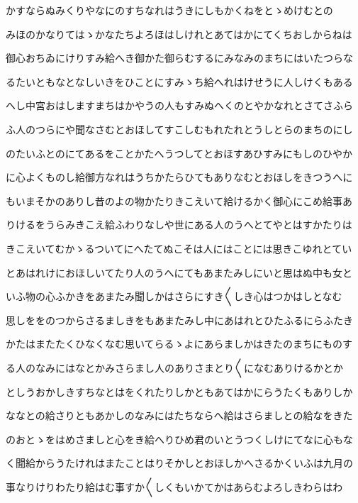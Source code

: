 \documentclass[a4paper,11pt,landscape]{ltjtarticle}
\begin{document}
\par\medskip
かすならぬみくりやなにのすちなれはうきにしもかくねをとゝめけむとの
\par\medskip
みほのかなりてはゝかなたちよろほはしけれとあてはかにてくちおしからねは
\par\medskip
御心おちゐにけりすみ給へき御かた御らむするにみなみのまちにはいたつらな
\par\medskip
るたいともなとなしいきをひことにすみゝち給へれはけせうに人しけくもある
\par\medskip
へし中宮おはしますまちはかやうの人もすみぬへくのとやかなれとさてさふら
\par\medskip
ふ人のつらにや聞なさむとおほしてすこしむもれたれとうしとらのまちのにし
\par\medskip
のたいふとのにてあるをことかたへうつしてとおほすあひすみにもしのひやか
\par\medskip
に心よくものし給御方なれはうちかたらひてもありなむとおほしをきつうへに
\par\medskip
もいまそかのありし昔のよの物かたりきこえいて給けるかく御心にこめ給事あ
\par\medskip
りけるをうらみきこえ給ふわりなしや世にある人のうへとてやとはすかたりは
\par\medskip
きこえいてむかゝるついてにへたてぬこそは人にはことには思きこゆれとてい
\par\medskip
とあはれけにおほしいてたり人のうへにてもあまたみしにいと思はぬ中も女と
\par\medskip
いふ物の心ふかきをあまたみ聞しかはさらにすき〱しき心はつかはしとなむ
\par\medskip
思しををのつからさるましきをもあまたみし中にあはれとひたふるにらふたき
\par\medskip
かたはまたたくひなくなむ思いてらるゝよにあらましかはきたのまちにものす
\par\medskip
る人のなみにはなとかみさらまし人のありさまとり〱になむありけるかとか
\par\medskip
としうおかしきすちなとはをくれたりしかともあてはかにらうたくもありしか
\par\medskip
ななとの給さりともあかしのなみにはたちならへ給はさらましとの給なをきた
\par\medskip
のおとゝをはめさましと心をき給へりひめ君のいとうつくしけにてなに心もな
\par\medskip
く聞給からうたけれはまたことはりそかしとおほしかへさるかくいふは九月の
\par\medskip
事なりけりわたり給はむ事すか〱しくもいかてかはあらむよろしきわらはわ
\par\medskip
\end{document}
